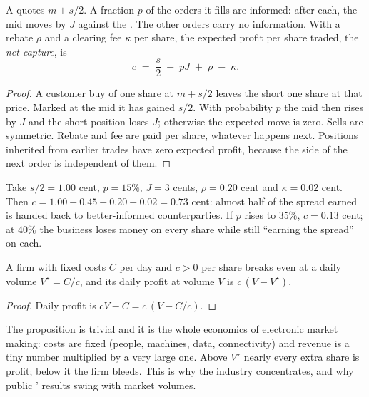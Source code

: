 \begin{proposition}\label{prop:m1:what-a-trading-firm-does:capture}
A  quotes $m \pm s/2$. A fraction $p$ of the orders it fills are
informed: after each, the mid moves by $J$ against the . The
other orders carry no information. With a rebate $\rho$ and a clearing fee
$\kappa$ per share, the expected profit per share traded, the
\emph{net capture}, is
\[
c \;=\; \frac{s}{2} \;-\; pJ \;+\; \rho \;-\; \kappa .
\]
\end{proposition}
\begin{proof}
A customer buy of one share at $m + s/2$ leaves the  short one
share at that price. Marked at the mid it has gained $s/2$. With probability
$p$ the mid then rises by $J$ and the short position loses $J$; otherwise the
expected move is zero. Sells are symmetric. Rebate and fee are paid per
share, whatever happens next. Positions inherited from earlier trades have
zero expected profit, because the side of the next order is independent of
them.
\end{proof}

\begin{example}\label{ex:m1:what-a-trading-firm-does:capture}
Take $s/2 = 1.00$ cent, $p = 15\%$, $J = 3$ cents, $\rho = 0.20$ cent and
$\kappa = 0.02$ cent. Then $c = 1.00 - 0.45 + 0.20 - 0.02 = 0.73$ cent: almost
half of the spread earned is handed back to better-informed counterparties.
If $p$ rises to $35\%$, $c = 0.13$ cent; at $40\%$ the business loses money
on every share while still ``earning the spread'' on each.
\end{example}

\begin{proposition}\label{prop:m1:what-a-trading-firm-does:breakeven}
A firm with fixed costs $C$ per day and  $c > 0$ per share breaks
even at a daily volume $V^\star = C/c$, and its daily profit at volume $V$ is
$c\,(V - V^\star)$.
\end{proposition}
\begin{proof}
Daily profit is $cV - C = c\,(V - C/c)$.
\end{proof}

The proposition is trivial and it is the whole economics of electronic
market making: costs are fixed (people, machines, data, connectivity) and
revenue is a tiny number multiplied by a very large one. Above $V^\star$
nearly every extra share is profit; below it the firm bleeds. This is why the
industry concentrates, and why public ' results swing with
market volumes.

